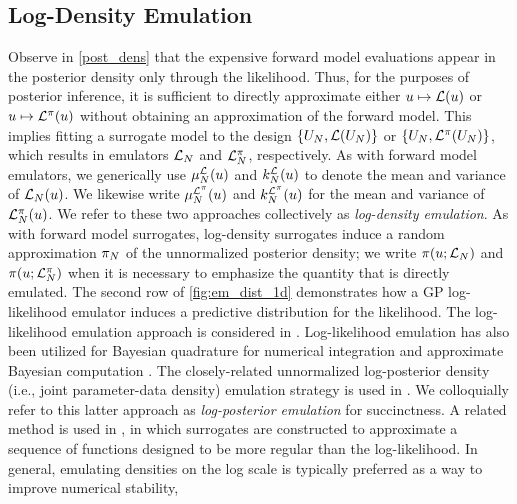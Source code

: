 \documentclass[12pt]{article}
\begin{document}
\subsection{Log-Density Emulation} \label{log_density_emulation}
Observe in \cref{post_dens} that the expensive forward model evaluations appear in the posterior density only through the 
likelihood. Thus, for the purposes of posterior inference, it is sufficient to directly approximate either
$\Par \mapsto \llik(\Par)$ or $\Par \mapsto \lpost(\Par)$ without obtaining an approximation of the forward model.
This implies fitting a surrogate model to the design $\{\designIn, \llik(\designIn)\}$ or $\{\designIn, \lpost(\designIn)\}$,
which results in emulators $\llikEm[\Ndesign]$ and $\lpostEm[\Ndesign]$, respectively.
As with forward model emulators, we generically use $\emMean[\Ndesign]{\llik}(\Par)$ and $\emKer[\Ndesign]{\llik}(\Par)$ 
to denote the mean and variance of $\llikEm[\Ndesign](\Par)$. We likewise write $\emMean[\Ndesign]{\lpost}(\Par)$ and 
$\emKer[\Ndesign]{\lpost}(\Par)$ for the mean and variance of $\lpostEm[\Ndesign](\Par)$.
We refer to these two approaches collectively as \textit{log-density emulation}.
As with forward model surrogates, log-density surrogates induce a random approximation $\postEm[\Ndesign]$ of the 
unnormalized posterior density; we write $\postDens(\Par; \llikEm[\Ndesign])$ and $\postDens(\Par; \lpostEm[\Ndesign])$
when it is necessary to emphasize the quantity that is directly emulated.
The second row of \cref{fig:em_dist_1d} demonstrates how a GP log-likelihood emulator induces a predictive 
distribution for the likelihood.
The log-likelihood emulation approach is considered in 
\citet{VehtariParallelGP,FATES_CES,trainDynamics,quantileApprox,ActiveLearningMCMC,FerEmulation,
StuartTeck1,random_fwd_models,GP_PDE_priors,OakleyllikEm}.
Log-likelihood emulation has also been utilized for Bayesian quadrature for numerical 
integration \citep{BayesQuadrature,BayesQuadRatios} and approximate Bayesian 
computation \citep{llikEmABC}.
The closely-related unnormalized log-posterior density (i.e., joint parameter-data density) emulation
strategy is used in \citet{emPostDens,Kandasamy_2017,llikRBF,gp_surrogates_random_exploration,landslideCalibration}.
We colloquially refer to this latter approach as \textit{log-posterior emulation} for succinctness.
A related method is used in \citep{wang2018adaptive,adaptiveMultimodal}, in which surrogates are constructed 
to approximate a sequence of functions designed to be more regular than the log-likelihood.   
In general, emulating densities on the log scale is typically preferred as a way to improve numerical stability,
\end{document}
